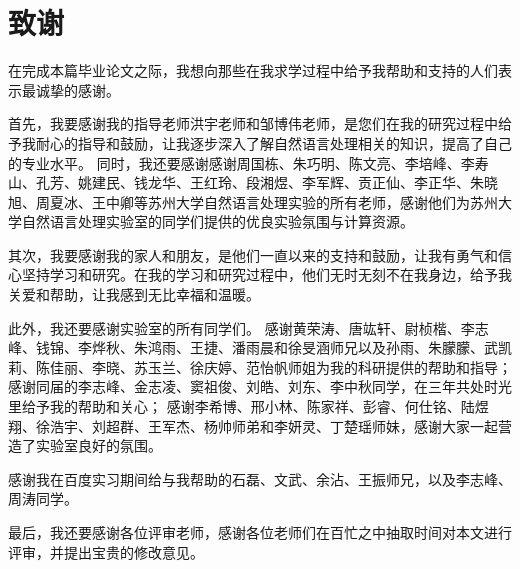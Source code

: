 \chapter{致谢}

在完成本篇毕业论文之际，我想向那些在我求学过程中给予我帮助和支持的人们表示最诚挚的感谢。

首先，我要感谢我的指导老师洪宇老师和邹博伟老师，是您们在我的研究过程中给予我耐心的指导和鼓励，让我逐步深入了解自然语言处理相关的知识，提高了自己的专业水平。
同时，我还要感谢感谢周国栋、朱巧明、陈文亮、李培峰、李寿山、孔芳、姚建民、钱龙华、王红玲、段湘煜、李军辉、贡正仙、李正华、朱晓旭、周夏冰、王中卿等苏州大学自然语言处理实验的所有老师，感谢他们为苏州大学自然语言处理实验室的同学们提供的优良实验氛围与计算资源。

其次，我要感谢我的家人和朋友，是他们一直以来的支持和鼓励，让我有勇气和信心坚持学习和研究。在我的学习和研究过程中，他们无时无刻不在我身边，给予我关爱和帮助，让我感到无比幸福和温暖。

此外，我还要感谢实验室的所有同学们。
感谢黄荣涛、唐竑轩、尉桢楷、李志峰、钱锦、李烨秋、朱鸿雨、王捷、潘雨晨和徐旻涵师兄以及孙雨、朱朦朦、武凯莉、陈佳丽、李晓、苏玉兰、徐庆婷、范怡帆师姐为我的科研提供的帮助和指导；
感谢同届的李志峰、金志凌、窦祖俊、刘皓、刘东、李中秋同学，在三年共处时光里给予我的帮助和关心；
感谢李希博、邢小林、陈家祥、彭睿、何仕铭、陆煜翔、徐浩宇、刘超群、王军杰、杨帅师弟和李妍灵、丁楚瑶师妹，感谢大家一起营造了实验室良好的氛围。

感谢我在百度实习期间给与我帮助的石磊、文武、余沾、王振师兄，以及李志峰、周涛同学。

最后，我还要感谢各位评审老师，感谢各位老师们在百忙之中抽取时间对本文进行评审，并提出宝贵的修改意见。


